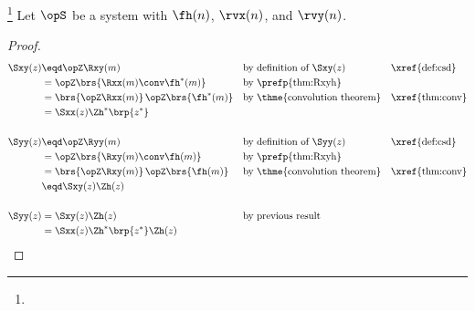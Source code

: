 \begin{theorem}
\footnote{
  }
\label{thm:Sxy}
Let $\opS$ be a system with  $\fh(n)$,
 $\rvx(n)$, and  $\rvy(n)$.
\end{theorem}
\begin{proof}
\begin{align*}
  \Sxy(z)
     &\eqd \opZ \Rxy(m)
    && \text{by definition of $\Sxy(z)$}
    && \text{\xref{def:csd}}
   \\&= \opZ \brs{\Rxx(m) \conv \fh^\ast(m)}
    && \text{by \prefp{thm:Rxyh}}
   \\&= \brs{\opZ\Rxx(m)}\,\opZ\brs{\fh^\ast(m)}
    && \text{by \thme{convolution theorem}}
    && \text{\xref{thm:conv}}
   \\&= \Sxx(z) \Zh^\ast\brp{z^\ast}
   \\
   \\
  \Syy(z)
     &\eqd \opZ \Ryy(m)
    && \text{by definition of $\Syy(z)$}
    && \text{\xref{def:csd}}
   \\&= \opZ \brs{\Rxy(m) \conv \fh(m)}
    && \text{by \prefp{thm:Rxyh}}
   \\&= \brs{\opZ\Rxy(m)}\,\opZ\brs{\fh(m)}
    && \text{by \thme{convolution theorem}}
    && \text{\xref{thm:conv}}
   \\&\eqd \Sxy(z) \Zh(z)
   \\
   \\
  \Syy(z)
     &= \Sxy(z) \Zh(z)
     && \text{by previous result}
   \\&= \Sxx(z) \Zh^\ast\brp{z^\ast} \Zh(z)
\end{align*}
\end{proof}

